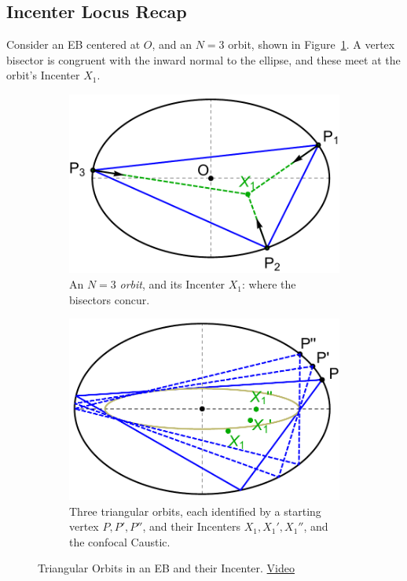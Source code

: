 \subsection{Incenter Locus Recap}

Consider an EB centered at $O$, and an $N=3$ orbit, shown in Figure~\ref{fig:single-orbit}. A vertex bisector is congruent with the inward normal to the ellipse, and these meet at the orbit's Incenter $X_1$.

\begin{figure}[H]
     \centering
     \begin{subfigure}[t]{0.45\textwidth}
         \centering
         \includegraphics[height=.65 \linewidth]{pics/u0000_single_orbit.pdf}
         \caption{An $N=3$ {\em orbit}, and its Incenter $X_1$: where the bisectors concur.}
         \label{fig:single-orbit}
     \end{subfigure}
     \hfill
     \begin{subfigure}[t]{0.45\textwidth}
         \centering
          \includegraphics[height=.65\linewidth]{pics/u0010_three_orbits.pdf}
         \caption{Three triangular orbits, each identified by a starting vertex $P,P',P''$, and their Incenters $X_1,X_1',X_1''$, and the confocal Caustic.
         \label{fig:three-orbits}}
     \end{subfigure}
     \caption{Triangular Orbits in an EB and their Incenter. \href{https://youtu.be/Y3q35DObfZU}{Video} \cite[pl\#6]{dsr_math_intell_playlist}}
      \label{fig:6}
\end{figure}

